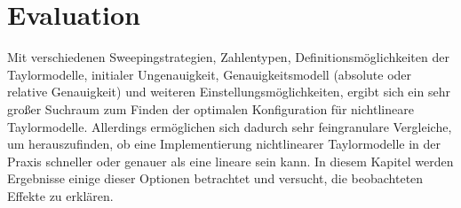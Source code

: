 
\chapter{Evaluation}
\label{ch:Evaluierung}
Mit verschiedenen Sweepingstrategien, Zahlentypen, Definitionsmöglichkeiten der Taylormodelle, initialer Ungenauigkeit, Genauigkeitsmodell (absolute oder relative Genauigkeit) und weiteren Einstellungsmöglichkeiten, ergibt sich ein sehr großer Suchraum zum Finden der optimalen Konfiguration für nichtlineare Taylormodelle. Allerdings ermöglichen sich dadurch sehr feingranulare Vergleiche, um herauszufinden, ob eine Implementierung nichtlinearer Taylormodelle in der Praxis schneller oder genauer als eine lineare sein kann. In diesem Kapitel werden Ergebnisse einige dieser Optionen betrachtet und versucht, die beobachteten Effekte zu erklären.




% 
% 
% 
% 
% 
% 
%


\label{ch:Evaluierung:sec:zusammenfassung}



